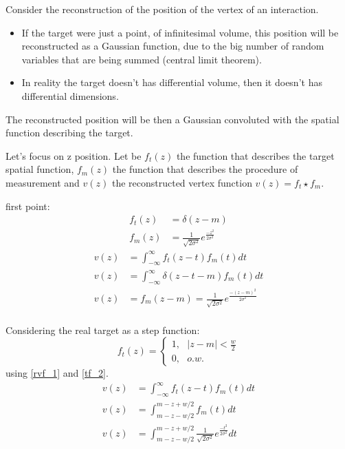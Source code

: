 \documentclass[12pt,letterpaper]{article}
\author{Orlando Soto}
\begin{document}
Consider the reconstruction of the position of the vertex of an interaction.
\begin{itemize}
\item If the target were just a point, of infinitesimal volume, this position will be reconstructed as a Gaussian function, due to the big number of random variables that are being summed (central limit theorem).
\item In reality the target doesn't has differential volume, then it doesn't has differential dimensions.
\end{itemize}
The reconstructed position will be then a Gaussian convoluted with the spatial function describing the target.

Let's focus on z position. Let be $f_t(z)$ the function that describes the target spatial function, $f_m(z)$ the function that describes the procedure of measurement and $v(z)$ the reconstructed vertex function $v(z) = f_t \star f_m$.

first point:
\begin{align}
f_t(z) &= \delta (z-m) \label{tf_1}\\
f_m(z) &= \frac{1}{\sqrt{2\sigma^2}}e^{\frac{-z^2}{2\sigma^2}}\label{mf_1}
\end{align}
\begin{align}
v(z) &= \int_{-\infty}^{\infty} f_t(z-t)f_m(t)dt\label{rvf_1}\\
v(z) &= \int_{-\infty}^{\infty} \delta(z-t-m)f_m(t)dt\\
v(z) &= f_m(z-m) = \frac{1}{\sqrt{2\sigma^2}}e^{\frac{-(z-m)^2}{2\sigma^2}}\\
\end{align}

Considering the real target as a step function:
\begin{equation}
f_t(z) = \left\lbrace\begin{matrix}
1,~~~|z-m|<\frac{w}{2}\\
0,~~~ o.w.
\end{matrix}\right. \label{tf_2}
\end{equation}
using \eqref{rvf_1} and \eqref{tf_2}.
\begin{align}
v(z) &= \int_{-\infty}^{\infty} f_t(z-t)f_m(t)dt\label{rvf_2}\\
v(z) &= \int_{m-z-w/2}^{m-z+w/2} f_m(t)dt\\
v(z) &= \int_{m-z-w/2}^{m-z+w/2} \frac{1}{\sqrt{2\sigma^2}}e^{\frac{-t^2}{2\sigma^2}}dt\label{vz_2b}
\end{align}
\end{document}
